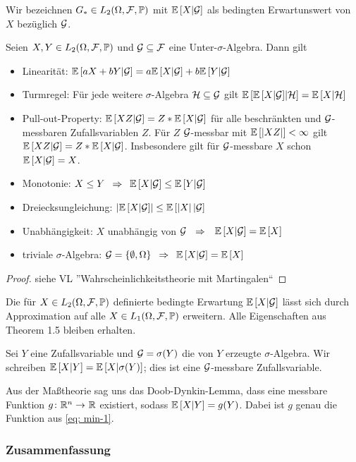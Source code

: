 
Wir bezeichnen $G_\ast \in L_2(\Omega, \F, \P)$ mit $\EW[X|\G]$ als bedingten Erwartunswert von $X$ bezüglich $\G$.

\begin{theorem} %
	Seien $X,Y \in L_2(\Omega,\F,\P)$ und $\G \subseteq \F$ eine Unter-$\sigma$-Algebra. Dann gilt
	\begin{itemize}
		\item Linearität: $\EW[aX + bY | \G] = a \EW[X|\G] + b\EW[Y|\G]$
		\item Turmregel: Für jede weitere $\sigma$-Algebra $\mathcal{H} \subseteq \G$ gilt ${\EW[{\EW[{X|\G}]}|\mathcal{H}]} = {\EW[X|\mathcal{H}]}$
		\item Pull-out-Property: $\EW[XZ|\G] = Z * \EW[X | \G]$ für alle beschränkten und $\G$-messbaren Zufallsvariablen $Z$.
		Für $Z$ $\G$-messbar mit $\EW[\abs{XZ}] < \infty$ gilt $\EW[XZ | \G] = Z * \EW[X | \G]$. Insbesondere gilt für $\G$-messbare $X$ schon $\EW[X|\G]=X$.
		\item Monotonie: $X \le Y \follows \EW[X|\G] \le \EW[Y|\G]$
		\item Dreiecksungleichung: $\abs{\EW[X|\G]} \le \EW[\abs{X}|\G]$
		\item Unabhängigkeit: $X$ unabhängig von $\G$ $\follows$ $\EW[X|\G] = \EW[X]$
		\item triviale $\sigma$-Algebra: $\G=\menge{\emptyset, \Omega} \follows \EW[X|\G] = \EW[X]$
	\end{itemize}
\end{theorem}
\begin{proof}
	siehe VL ''Wahrscheinlichkeitstheorie mit Martingalen``
\end{proof}

Die für $X \in L_2(\Omega,\F,\P)$ definierte bedingte Erwartung $\EW[X|\G]$ lässt sich durch Approximation auf alle $X \in L_1(\Omega,\F,\P)$ erweitern. Alle Eigenschaften aus Theorem 1.5 bleiben erhalten. %

Sei $Y$ eine Zufallsvariable und $\G= \sigma(Y)$ die von $Y$ erzeugte $\sigma$-Algebra. Wir schreiben $\EW[X|Y] = \EW[X|\sigma(Y)]$; dies ist eine $\G$-messbare Zufallsvariable.

Aus der Maßtheorie sag uns das Doob-Dynkin-Lemma, dass eine messbare Funktion $\abb{g}{\Rn}{\R}$ existiert, sodass $\EW[X|Y] = g(Y)$. Dabei ist $g$ genau die Funktion aus \eqref{eq: min-1}.

\subsubsection*{Zusammenfassung}


